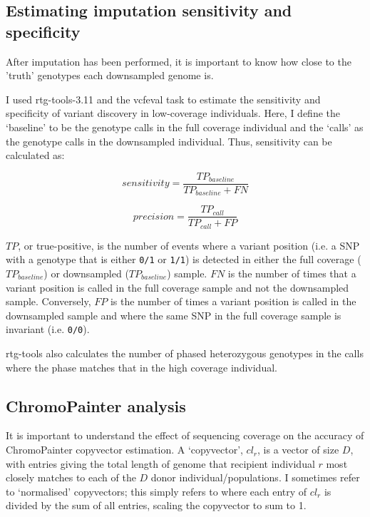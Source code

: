 \subsection{Estimating imputation sensitivity and specificity}

After imputation has been performed, it is important to know how close to the 'truth' genotypes each downsampled genome is. 

I used rtg-tools-3.11 \cite{cleary2014joint} and the vcfeval task to estimate the sensitivity and specificity of variant discovery in low-coverage individuals. Here, I define the `baseline' to be the genotype calls in the full coverage individual and the `calls' as the genotype calls in the downsampled individual. Thus, sensitivity can be calculated as: 

\begin{equation}
sensitivity = \frac{TP_{baseline}}{TP_{baseline} + FN}
\end{equation}

\begin{equation}
precision = \frac{TP_{call}}{TP_{call} + FP}
\end{equation}


$TP$, or true-positive, is the number of events where a variant position (i.e. a SNP with a genotype that is either \texttt{0/1} or \texttt{1/1}) is detected in either the full coverage ($TP_{baseline}$) or downsampled ($TP_{baseline}$) sample. $FN$ is the number of times that a variant position is called in the full coverage sample and not the downsampled sample. Conversely, $FP$ is the number of times a variant position is called in the downsampled sample and where the same SNP in the full coverage sample is invariant (i.e. \texttt{0/0}). 

rtg-tools also calculates the number of phased heterozygous genotypes in the calls where the phase matches that in the high coverage individual. 

\subsection{ChromoPainter analysis} \label{ChromoPainter_analysis}

It is important to understand the effect of sequencing coverage on the accuracy of ChromoPainter copyvector estimation. A `copyvector', $cl_{r}$, is a vector of size $D$, with entries giving the total length of genome that recipient individual $r$ most closely matches to each of the $D$ donor individual/populations. I sometimes refer to `normalised' copyvectors; this simply refers to where each entry of $cl_r$ is divided by the sum of all entries, scaling the copyvector to sum to 1. 

